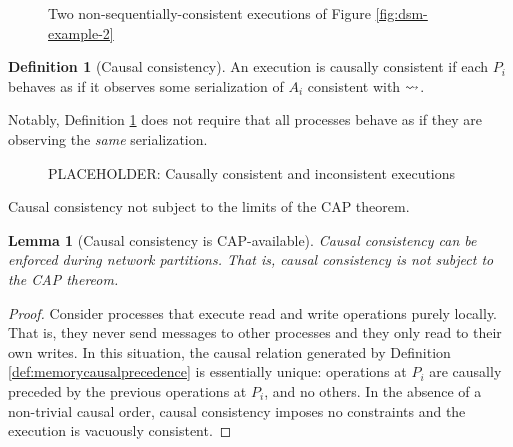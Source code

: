 \documentclass[]             %
{NASA}                       %
\newtheorem{lemma}[theorem]{Lemma}
\theoremstyle{definition}
\newtheorem{definition}[theorem]{Definition}
\begin{document}
\begin{figure}[p]
  \begin{subfigure}{1\textwidth}
    \centering
    
    \caption{}
    \label{fig:smEx4L2}
  \end{subfigure}
  \begin{subfigure}{1\textwidth}
    
    \caption{}
    \label{fig:smEx4S2}
  \end{subfigure}
  \caption{Two non-sequentially-consistent executions of Figure \ref{fig:dsm-example-2}}
  \label{fig:smEx4-alt}
\end{figure}

\begin{definition}[Causal consistency]
  \label{def:causalconsistency}
  An execution is causally consistent if each $P_i$ behaves as if it
  observes some serialization of $A_i$ consistent with $\rightsquigarrow$.
\end{definition}

Notably, Definition \ref{def:causalconsistency} does not require that
all processes behave as if they are observing the \emph{same}
serialization.

\begin{figure}
  \begin{subfigure}{1\textwidth}
    \centering
    
    \caption{}
    \label{fig:smEx1L1}
  \end{subfigure}

  \begin{subfigure}{1\textwidth}
    
    \caption{}
    \label{fig:smEx5}
  \end{subfigure}

  \caption{PLACEHOLDER: Causally consistent and inconsistent executions}
  \label{fig:smCausal}
\end{figure}
\clearpage

Causal consistency not subject to the limits of the CAP theorem.

\begin{lemma}[Causal consistency is CAP-available]
  \label{thm:cap-causal}
  Causal consistency can be enforced during network partitions. That
  is, causal consistency is not subject to the CAP thereom.
\end{lemma}
\begin{proof}
  Consider processes that execute read and write operations purely
  locally. That is, they never send messages to other processes and
  they only read to their own writes. In this situation, the causal
  relation generated by Definition \ref{def:memorycausalprecedence} is
  essentially unique: operations at $P_i$ are causally preceded by the
  previous operations at $P_i$, and no others. In the absence of a
  non-trivial causal order, causal consistency imposes no constraints
  and the execution is vacuously consistent.
\end{proof}
\end{document}

